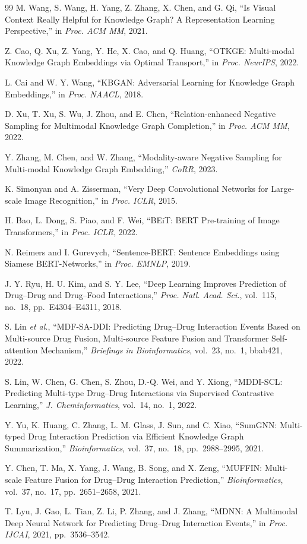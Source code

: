 \documentclass[conference]{IEEEtran}
\begin{document}
\begin{thebibliography}{99}
M. Wang, S. Wang, H. Yang, Z. Zhang, X. Chen, and G. Qi, ``Is Visual Context Really Helpful for
Knowledge Graph? A Representation Learning Perspective,'' in \emph{Proc. ACM MM}, 2021.

Z. Cao, Q. Xu, Z. Yang, Y. He, X. Cao, and Q. Huang, ``OTKGE: Multi-modal Knowledge Graph Embeddings
via Optimal Transport,'' in \emph{Proc. NeurIPS}, 2022.

L. Cai and W. Y. Wang, ``KBGAN: Adversarial Learning for Knowledge Graph Embeddings,'' in
\emph{Proc. NAACL}, 2018.

D. Xu, T. Xu, S. Wu, J. Zhou, and E. Chen, ``Relation-enhanced Negative Sampling for Multimodal
Knowledge Graph Completion,'' in \emph{Proc. ACM MM}, 2022.

Y. Zhang, M. Chen, and W. Zhang, ``Modality-aware Negative Sampling for Multi-modal Knowledge Graph
Embedding,'' \emph{CoRR}, 2023.

K. Simonyan and A. Zisserman, ``Very Deep Convolutional Networks for Large-scale Image
Recognition,'' in \emph{Proc. ICLR}, 2015.

H. Bao, L. Dong, S. Piao, and F. Wei, ``BEiT: BERT Pre-training of Image Transformers,'' in
\emph{Proc. ICLR}, 2022.

N. Reimers and I. Gurevych, ``Sentence-BERT: Sentence Embeddings using Siamese BERT-Networks,'' in
\emph{Proc. EMNLP}, 2019.

J. Y. Ryu, H. U. Kim, and S. Y. Lee, ``Deep Learning Improves Prediction of Drug--Drug and
Drug--Food Interactions,'' \emph{Proc. Natl. Acad. Sci.}, vol.~115, no.~18, pp.~E4304--E4311, 2018.

S. Lin \emph{et al.}, ``MDF-SA-DDI: Predicting Drug--Drug Interaction Events Based on Multi-source
Drug Fusion, Multi-source Feature Fusion and Transformer Self-attention Mechanism,''
\emph{Briefings in Bioinformatics}, vol.~23, no.~1, bbab421, 2022.

S. Lin, W. Chen, G. Chen, S. Zhou, D.-Q. Wei, and Y. Xiong, ``MDDI-SCL: Predicting Multi-type
Drug--Drug Interactions via Supervised Contrastive Learning,'' \emph{J. Cheminformatics}, vol.~14,
no.~1, 2022.

Y. Yu, K. Huang, C. Zhang, L. M. Glass, J. Sun, and C. Xiao, ``SumGNN: Multi-typed Drug Interaction
Prediction via Efficient Knowledge Graph Summarization,'' \emph{Bioinformatics}, vol.~37, no.~18,
pp.~2988--2995, 2021.

Y. Chen, T. Ma, X. Yang, J. Wang, B. Song, and X. Zeng, ``MUFFIN: Multi-scale Feature Fusion for
Drug--Drug Interaction Prediction,'' \emph{Bioinformatics}, vol.~37, no.~17, pp.~2651--2658, 2021.

T. Lyu, J. Gao, L. Tian, Z. Li, P. Zhang, and J. Zhang, ``MDNN: A Multimodal Deep Neural Network
for Predicting Drug--Drug Interaction Events,'' in \emph{Proc. IJCAI}, 2021, pp.~3536--3542.

\end{thebibliography}
\end{document}
